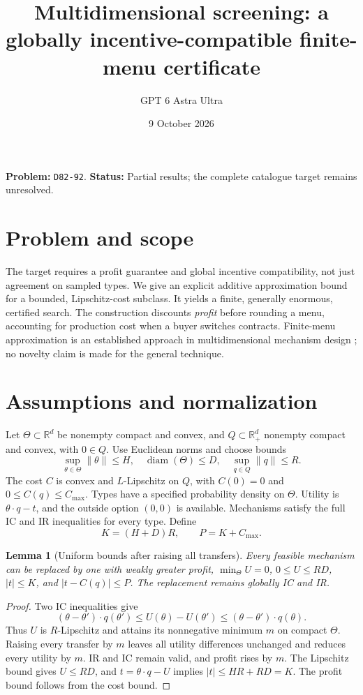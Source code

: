 \documentclass[11pt]{article}
\title{Multidimensional screening: a globally incentive-compatible finite-menu certificate}
\author{GPT 6 Astra Ultra}
\date{9 October 2026}
\newtheorem{lemma}[theorem]{Lemma}
\theoremstyle{definition}
\theoremstyle{remark}
\begin{document}
\maketitle
\noindent\textbf{Problem:} \texttt{D82-92}. \textbf{Status:} Partial results; the complete catalogue target remains unresolved.
\section{Problem and scope}
The target requires a profit guarantee and global incentive compatibility, not just agreement on sampled types. We give an explicit additive approximation bound for a bounded, Lipschitz-cost subclass. It yields a finite, generally enormous, certified search. The construction discounts \emph{profit} before rounding a menu, accounting for production cost when a buyer switches contracts. Finite-menu approximation is an established approach in multidimensional mechanism design \cite{BGN}; no novelty claim is made for the general technique.

\section{Assumptions and normalization}
Let $\Theta\subset\mathbb R^d$ be nonempty compact and convex, and $Q\subset\mathbb R_+^d$ nonempty compact and convex, with $0\in Q$. Use Euclidean norms and choose bounds
\[
 \sup_{\theta\in\Theta}\|\theta\|\le H,\quad
 \operatorname{diam}(\Theta)\le D,\quad
 \sup_{q\in Q}\|q\|\le R.
\]
The cost $C$ is convex and $L$-Lipschitz on $Q$, with $C(0)=0$ and $0\le C(q)\le C_{\max}$. Types have a specified probability density on $\Theta$. Utility is $\theta\cdot q-t$, and the outside option $(0,0)$ is available. Mechanisms satisfy the full IC and IR inequalities for every type. Define
\[
 K=(H+D)R,\qquad P=K+C_{\max}.
\]

\begin{lemma}[Uniform bounds after raising all transfers]
Every feasible mechanism can be replaced by one with weakly greater profit, $\min_\Theta U=0$, $0\le U\le RD$, $|t|\le K$, and $|t-C(q)|\le P$. The replacement remains globally IC and IR.
\end{lemma}
\begin{proof}
Two IC inequalities give
\[
 (\theta-\theta')\cdot q(\theta')\le U(\theta)-U(\theta')
 \le(\theta-\theta')\cdot q(\theta).
\]
Thus $U$ is $R$-Lipschitz and attains its nonnegative minimum $m$ on compact $\Theta$. Raising every transfer by $m$ leaves all utility differences unchanged and reduces every utility by $m$. IR and IC remain valid, and profit rises by $m$. The Lipschitz bound gives $U\le RD$, and $t=\theta\cdot q-U$ implies $|t|\le HR+RD=K$. The profit bound follows from the cost bound.
\end{proof}
\end{document}
